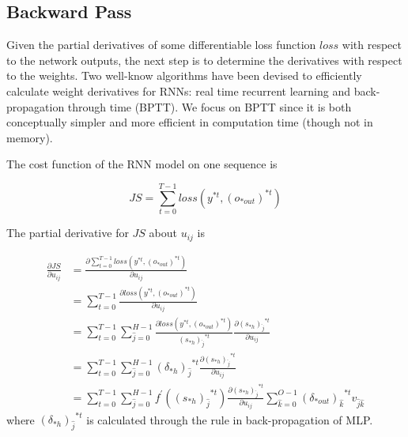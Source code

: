 \documentclass[runningheads,openany]{xhlPaper}
\begin{document}
\subsection{Backward Pass}
Given the partial derivatives of some differentiable loss function $loss$ with respect to the network outputs, the next step is to determine the derivatives with respect to the weights. Two well-know algorithms have been devised to efficiently calculate weight derivatives for RNNs: real time recurrent learning and back-propagation through time (BPTT).
We focus on BPTT since it is both conceptually simpler and more efficient in computation time (though not in memory).

The cost function of the RNN model on one sequence is 

\begin{equation}
\label{equ:rnn_cost_function}
JS = \sum\limits_{t = 0}^{T - 1} {loss\left( {{y^{*t}},{{\left( {{o_{*out}}} \right)}^{*t}}} \right)} 
\end{equation}

The partial derivative for $JS$ about ${{u_{ij}}}$ is 

\begin{equation}
\label{equ:rnn_derivative_u}
\begin{aligned}
\frac{{\partial JS}}{{\partial {u_{ij}}}} &= \frac{{\partial \sum\limits_{t = 0}^{T - 1} {loss\left( {{y^{*t}},{{\left( {{o_{*out}}} \right)}^{*t}}} \right)} }}{{\partial {u_{ij}}}}\\
 &= \sum\limits_{t = 0}^{T - 1} {\frac{{\partial loss\left( {{y^{*t}},{{\left( {{o_{*out}}} \right)}^{*t}}} \right)}}{{\partial {u_{ij}}}}} \\
 &= \sum\limits_{t = 0}^{T - 1} {\sum\limits_{\hat j = 0}^{H - 1} {\frac{{\partial loss\left( {{y^{*t}},{{\left( {{o_{*out}}} \right)}^{*t}}} \right)}}{{{{\left( {{s_{*h}}} \right)}_{\hat j}}^{*t}}}\frac{{\partial {{\left( {{s_{*h}}} \right)}_{\hat j}}^{*t}}}{{\partial {u_{ij}}}}} } \\
 &= \sum\limits_{t = 0}^{T - 1} {\sum\limits_{\hat j = 0}^{H - 1} {{{\left( {{\delta _{*h}}} \right)}_{\hat j}}^{*t}\frac{{\partial {{\left( {{s_{*h}}} \right)}_{\hat j}}^{*t}}}{{\partial {u_{ij}}}}} } \\
 &= \sum\limits_{t = 0}^{T - 1} {\sum\limits_{\hat j = 0}^{H - 1} {{f^{'}}\left( {{{\left( {{s_{*h}}} \right)}_{\hat j}}^{*t}} \right)\frac{{\partial {{\left( {{s_{*h}}} \right)}_{\hat j}}^{*t}}}{{\partial {u_{ij}}}}\sum\limits_{\hat k = 0}^{O - 1} {{{\left( {{\delta _{*out}}} \right)}_{\hat k}}^{*t}{v_{\hat j\hat k}}} } } 
\end{aligned}
\end{equation}
where ${{{\left( {{\delta _{*h}}} \right)}_{\hat j}}^{*t}}$ is calculated through the rule in back-propagation of MLP.
\end{document}
